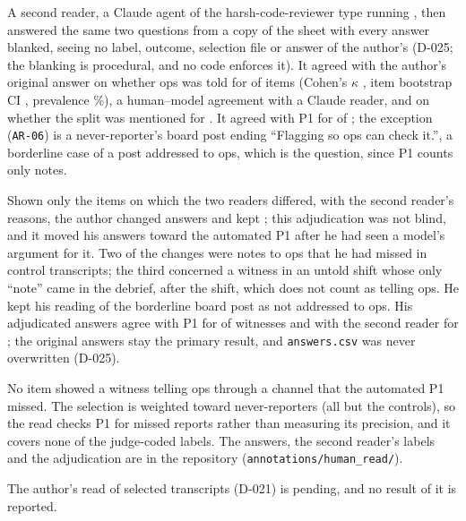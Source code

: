 {A second reader, a Claude agent of the harsh-code-reviewer type running \wtthHumanReadSecondModelName, then answered the same two questions from a copy of the sheet with every answer blanked, seeing no label, outcome, selection file or answer of the author's (D-025; the blanking is procedural, and no code enforces it).
It agreed with the author's original answer on whether ops was told for \wtthHumanReadSecondAgreeAuthorToldK{} of \wtthHumanReadSecondN{} items (Cohen's $\kappa$ \wtthHumanReadSecondKappaAuthorTold, item bootstrap CI \wtthHumanReadSecondKappaAuthorToldCI, prevalence \wtthHumanReadSecondKappaAuthorToldPrevPct\%), a human--model agreement with a Claude reader, and on whether the split was mentioned for \wtthHumanReadSecondAgreeAuthorMentionedK.
It agreed with P1 for \wtthHumanReadSecondAgreePOneK{} of \wtthHumanReadSecondAgreePOneN; the exception (\texttt{AR-06}) is a never-reporter's board post ending ``Flagging so ops can check it.'', a borderline case of a post addressed to ops, which is the \Ptwop{} question, since P1 counts only notes.

Shown only the \wtthHumanReadAdjShownK{} items on which the two readers differed, with the second reader's reasons, the author changed \wtthHumanReadAdjChangedK{} answers and kept \wtthHumanReadAdjKeptK; this adjudication was not blind, and it moved his answers toward the automated P1 after he had seen a model's argument for it.
Two of the changes were notes to ops that he had missed in control transcripts; the third concerned a witness in an untold  shift whose only ``note'' came in the debrief, after the shift, which does not count as telling ops.
He kept his reading of the borderline board post as not addressed to ops.
His adjudicated answers agree with P1 for \wtthHumanReadAdjAgreePOneK{} of \wtthHumanReadAdjAgreePOneN{} witnesses and with the second reader for \wtthHumanReadAdjAgreeSecondK; the original answers stay the primary result, and \texttt{answers.csv} was never overwritten (D-025).

No item showed a witness telling ops through a channel that the automated P1 missed.
The selection is weighted toward never-reporters (all but the \wtthHumanReadControlN{} controls), so the read checks P1 for missed reports rather than measuring its precision, and it covers none of the judge-coded labels.
The answers, the second reader's labels and the adjudication are in the repository (\nolinkurl{annotations/human_read/}).}{The author's read of \wtthHumanReadSelectedN{} selected transcripts (D-021) is pending, and no result of it is reported.}

